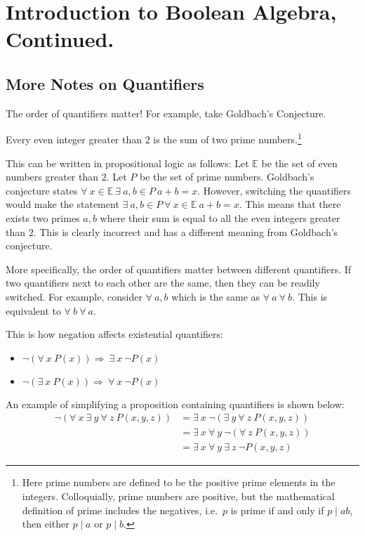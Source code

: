 
\section{Introduction to Boolean Algebra, Continued.}

\subsection{More Notes on Quantifiers}

The order of quantifiers matter! For example, take Goldbach's Conjecture.

\begin{proposition}
    Every even integer greater than \(2\) is the sum of two prime numbers.\footnote{Here prime numbers are defined to be the 
    positive prime elements in the integers. Colloquially, prime numbers are positive, but the mathematical definition of prime
    includes the negatives, i.e.\ \(p\) is prime if and only if \(p\mid ab\), then either \(p\mid a\) or \(p\mid b\).} 
\end{proposition}
This can be written in propositional logic as follows: Let \(\mathbb{E}\) be the set of even numbers greater than \(2\). Let \(P\) be the set of
prime numbers. Goldbach's conjecture states \(\forall\:x\in\mathbb{E}\:\exists\:a,b\in P\:a+b=x\). However, switching the quantifiers would make
the statement \(\exists\:a,b\in P\:\forall\:x\in\mathbb{E}\:a+b=x\). This means that there exists two primes \(a,b\) where their sum is equal to
all the even integers greater than \(2\). This is clearly incorrect and has a different meaning from Goldbach's conjecture. 

More specifically, the order of quantifiers matter between different quantifiers. If two quantifiers next to each other are the same, then they can 
be readily switched. For example, consider \(\forall\:a,b\) which is the same as \(\forall\:a\:\forall\:b\). This is equivalent to 
\(\forall\:b\:\forall\:a\).

\bigskip
This is how negation affects existential quantifiers:
\begin{itemize}
    \item \(\lnot(\forall\:x\:P(x))\Rightarrow\:\exists\:x\:\lnot P(x)\)
    \item \(\lnot(\exists\:x\:P(x))\Rightarrow\:\forall\:x\:\lnot P(x)\)
\end{itemize}
An example of simplifying a proposition containing quantifiers is shown below:
\begin{align*}
    \lnot(\forall\:x\:\exists\:y\:\forall\:z\:P(x,y,z))&=\exists\:x\:\lnot(\exists\:y\:\forall\:z\:P(x,y,z))\\
                                                       &=\exists\:x\:\forall\:y\:\lnot(\forall\:z\:P(x,y,z))\\
                                                       &=\exists\:x\:\forall\:y\:\exists\:z\:\lnot P(x,y,z)
\end{align*}

